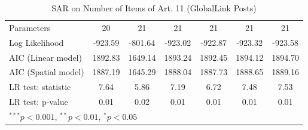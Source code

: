 \begin{table}[!h]
\begin{center}
\begin{tabular}{l c c c c c c }
Parameters              & 20           & 21           & 21           & 21           & 21           & 21           \\
Log Likelihood          & -923.59      & -801.64      & -923.02      & -922.87      & -923.32      & -923.58      \\
AIC (Linear model)      & 1892.83      & 1649.14      & 1893.24      & 1892.45      & 1894.12      & 1894.70      \\
AIC (Spatial model)     & 1887.19      & 1645.29      & 1888.04      & 1887.73      & 1888.65      & 1889.16      \\
LR test: statistic      & 7.64         & 5.86         & 7.19         & 6.72         & 7.48         & 7.53         \\
LR test: p-value        & 0.01         & 0.02         & 0.01         & 0.01         & 0.01         & 0.01         \\
\bottomrule
\multicolumn{7}{l}{\scriptsize{$^{***}p<0.001$, $^{**}p<0.01$, $^*p<0.05$}}
\end{tabular}
\caption{SAR on Number of Items of Art. 11 (GlobalLink Posts)}
\label{table:coefficients}
\end{center}
\end{table}
